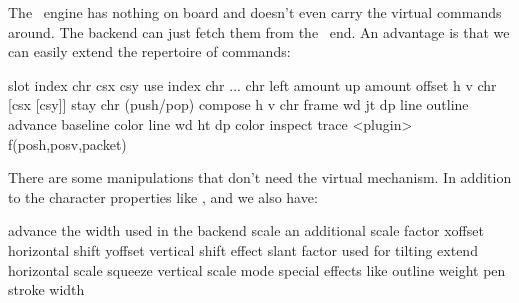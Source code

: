 The \LUAMETATEX\ engine has nothing on board and doesn't even carry the virtual
commands around. The backend can just fetch them from the \LUA\ end. An advantage is
that we can easily extend the repertoire of commands:

\starttabulate[|w(4em)||||]
\NC slot     \NC \textplus  \NC index chr csx csy                            \NC \NC \NR
\NC use      \NC \textplus  \NC index chr ... chr                            \NC \NC \NR
\NC left     \NC \textplus  \NC amount                                       \NC \NC \NR
\NC up       \NC \textplus  \NC amount                                       \NC \NC \NR
\NC offset   \NC \textplus  \NC h v chr [csx [csy]]                          \NC \NC \NR
\NC stay     \NC \textplus  \NC chr (push/pop)                               \NC \NC \NR
\NC compose  \NC \textplus  \NC h v chr                                      \NC \NC \NR
\NC frame    \NC \textplus  \NC wd jt dp line outline advance baseline color \NC \NC \NR
\NC line     \NC \textplus  \NC wd ht dp color                               \NC \NC \NR
\NC inspect  \NC \textplus  \NC                                              \NC \NC \NR
\NC trace    \NC \textplus  \NC                                              \NC \NC \NR
\NC <plugin> \NC \textplus  \NC                                              \NC f(posh,posv,packet) \NC \NR
\stoptabulate

There are some manipulations that don't need the virtual mechanism. In addition to the
character properties like ,  and  we also have:

\starttabulate[||||]
\NC advance \NC         \NC the width used in the backend \NC \NR
\NC scale   \NC         \NC an additional scale factor    \NC \NR
\NC xoffset \NC         \NC horizontal shift              \NC \NR
\NC yoffset \NC         \NC vertical shift                \NC \NR
\NC effect  \NC slant   \NC factor used for tilting       \NC \NR
\NC         \NC extend  \NC horizontal scale              \NC \NR
\NC         \NC squeeze \NC vertical scale               \NC \NR
\NC         \NC mode    \NC special effects like outline \NC \NR
\NC         \NC weight  \NC pen stroke width             \NC \NR
\stoptabulate

\stopsection

\stopdocument
